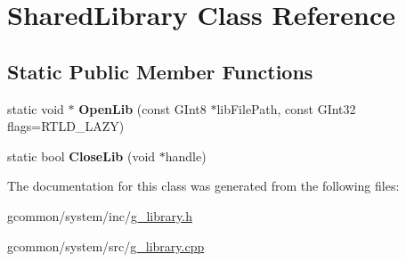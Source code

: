 \hypertarget{class_shared_library}{\section{Shared\-Library Class Reference}
\label{class_shared_library}
}
\subsection*{Static Public Member Functions}
\begin{DoxyCompactItemize}
\item 
\hypertarget{class_shared_library_a68c17f04cdfa65eb3e2866ba3f7147a5}{static void $\ast$ {\bfseries Open\-Lib} (const G\-Int8 $\ast$lib\-File\-Path, const G\-Int32 flags=R\-T\-L\-D\-\_\-\-L\-A\-Z\-Y)}\label{class_shared_library_a68c17f04cdfa65eb3e2866ba3f7147a5}

\item 
\hypertarget{class_shared_library_a3a9d3bd1330995bd422fbb53178ae2f2}{static bool {\bfseries Close\-Lib} (void $\ast$handle)}\label{class_shared_library_a3a9d3bd1330995bd422fbb53178ae2f2}

\end{DoxyCompactItemize}


The documentation for this class was generated from the following files\-:\begin{DoxyCompactItemize}
\item 
gcommon/system/inc/\hyperlink{g__library_8h}{g\-\_\-library.\-h}\item 
gcommon/system/src/\hyperlink{g__library_8cpp}{g\-\_\-library.\-cpp}\end{DoxyCompactItemize}
